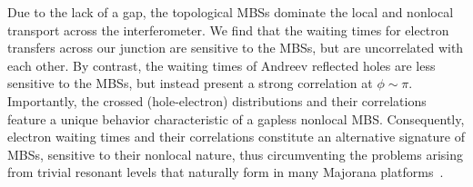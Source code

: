 \documentclass[aps,prl,amsmath,twocolumn,floatfix,superscriptaddress,longbibliography,footinbib]{revtex4-1}
\begin{document}
Due to the lack of a gap, the topological MBSs dominate the local and nonlocal transport across the interferometer. 
We find that the waiting times for electron transfers across our junction are sensitive to the MBSs, but are uncorrelated with each other. 
%
By contrast, the waiting times of Andreev reflected holes are less sensitive to the MBSs, but instead present a strong correlation at $\phi\sim\pi$. 
%
Importantly, the crossed (hole-electron) distributions and their correlations feature a unique behavior characteristic of a gapless nonlocal MBS. 
%
Consequently, electron waiting times and their correlations constitute an alternative signature of MBSs, sensitive to their nonlocal nature, thus circumventing the problems arising from trivial resonant levels that naturally form in many Majorana platforms~\cite{Frolov2019}. 
\end{document}
